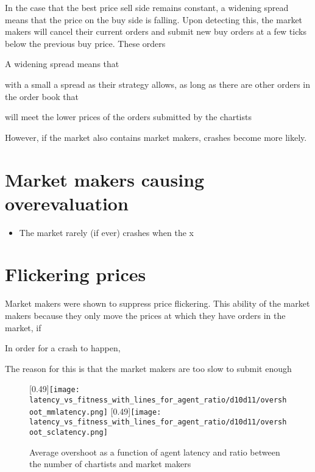 In the case that the best price sell side remains constant, a widening spread means that the price on the buy side is falling. Upon detecting this, the market makers will cancel their current orders and submit new buy orders at a few ticks below the previous buy price. These orders 

A widening spread means that 




with a small a spread as their strategy allows,  as long as there are other orders in the order book that 

will meet the lower prices of the orders submitted by the chartists 

However, if the market also contains market makers, crashes become more likely. 

\section{Market makers causing overevaluation}

\begin{itemize}
\item The market rarely (if ever) crashes when the x
\end{itemize}


\section{Flickering prices}

Market makers were shown to suppress price flickering. This ability of the market makers  because they only move the prices at which they have orders in the market, if 


In order for a crash to happen, 


The reason for this is that the market makers are too slow to submit enough 

\begin{figure}
	\centering
	\subcaptionbox{\label{fig:latency_vs_fitness_with_lines_for_agent_ratio_overshoot_mmlatency}}
	[0.49\linewidth]{\texttt{[image: latency\_vs\_fitness\_with\_lines\_for\_agent\_ratio/d10d11/overshoot\_mmlatency.png]}}
	\subcaptionbox{\label{fig:latency_vs_fitness_with_lines_for_agent_ratio_overshoot_sclatency}}
	[0.49\linewidth]{\texttt{[image: latency\_vs\_fitness\_with\_lines\_for\_agent\_ratio/d10d11/overshoot\_sclatency.png]}}
	\caption{Average overshoot as a function of agent latency and ratio between the number of chartists and market makers}
	\label{fig:faster_mm_makes_worse_markets_SC}
\end{figure}

